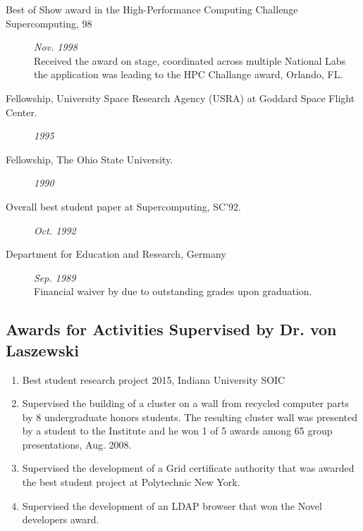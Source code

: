 \documentclass{article}
\begin{document}
\begin{description}
\item[Best of Show award in the High-Performance Computing Challenge Supercomputing‚ 98] \hfill {\it Nov. 1998} ~\\
  Received the award on stage, coordinated across multiple National Labs \\
  the application was leading to the HPC Challange award, Orlando, FL.
  
\item[Fellowship, University Space Research Agency (USRA) at Goddard Space Flight Center. ] \hfill {\it 1995}

\item[Fellowship, The Ohio State University. ] \hfill {\it 1990}

\item[Overall best student paper at Supercomputing‚ SC’92. ] \hfill {\it Oct. 1992}

\item[Department for Education and Research, Germany] \hfill {\it Sep. 1989} ~\\
  Financial waiver by due to outstanding grades upon graduation.
  
\end{description}


\subsection{Awards for Activities Supervised by Dr. von Laszewski}

\begin{enumerate}
  \item Best student research project 2015, Indiana University SOIC
  \item Supervised the building of a cluster on a wall from recycled computer parts by 8 undergraduate honors students. The resulting cluster wall was presented by a student to the Institute and he won 1 of 5 awards among 65 group presentations, Aug. 2008.
  \item  Supervised the development of a Grid certificate authority that was awarded the best student project at Polytechnic New York. 
  \item  Supervised the development of an LDAP browser that won the Novel developers award.
\end{enumerate}


\end{document}
